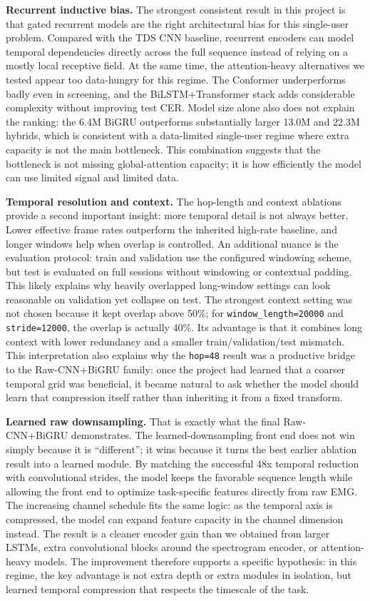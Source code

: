 \noindent\textbf{Recurrent inductive bias.} The strongest consistent result in this project is that gated recurrent models are the right architectural bias for this single-user problem. Compared with the TDS CNN baseline, recurrent encoders can model temporal dependencies directly across the full sequence instead of relying on a mostly local receptive field. At the same time, the attention-heavy alternatives we tested appear too data-hungry for this regime. The Conformer underperforms badly even in screening, and the BiLSTM+Transformer stack adds considerable complexity without improving test CER. Model size alone also does not explain the ranking: the 6.4M BiGRU outperforms substantially larger 13.0M and 22.3M hybrids, which is consistent with a data-limited single-user regime where extra capacity is not the main bottleneck. This combination suggests that the bottleneck is not missing global-attention capacity; it is how efficiently the model can use limited signal and limited data.

\noindent\textbf{Temporal resolution and context.} The hop-length and context ablations provide a second important insight: more temporal detail is not always better. Lower effective frame rates outperform the inherited high-rate baseline, and longer windows help when overlap is controlled. An additional nuance is the evaluation protocol: train and validation use the configured windowing scheme, but test is evaluated on full sessions without windowing or contextual padding. This likely explains why heavily overlapped long-window settings can look reasonable on validation yet collapse on test. The strongest context setting was not chosen because it kept overlap above 50\%; for \texttt{window\_length=20000} and \texttt{stride=12000}, the overlap is actually 40\%. Its advantage is that it combines long context with lower redundancy and a smaller train/validation/test mismatch. This interpretation also explains why the \texttt{hop=48} result was a productive bridge to the Raw-CNN+BiGRU family: once the project had learned that a coarser temporal grid was beneficial, it became natural to ask whether the model should learn that compression itself rather than inheriting it from a fixed transform.

\noindent\textbf{Learned raw downsampling.} That is exactly what the final Raw-CNN+BiGRU demonstrates. The learned-downsampling front end does not win simply because it is ``different''; it wins because it turns the best earlier ablation result into a learned module. By matching the successful 48x temporal reduction with convolutional strides, the model keeps the favorable sequence length while allowing the front end to optimize task-specific features directly from raw EMG. The increasing channel schedule fits the same logic: as the temporal axis is compressed, the model can expand feature capacity in the channel dimension instead. The result is a cleaner encoder gain than we obtained from larger LSTMs, extra convolutional blocks around the spectrogram encoder, or attention-heavy models. The improvement therefore supports a specific hypothesis: in this regime, the key advantage is not extra depth or extra modules in isolation, but learned temporal compression that respects the timescale of the task.

